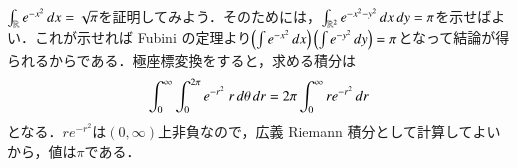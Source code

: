 \begin{exm}[Gauss 積分]$\int_{\mathbb{R}} e^{-x^2} \mathop{}\!d x = \sqrt{\pi}$を証明してみよう．そのためには，$\int_{\mathbb{R}^2} e^{-x^2-y^2} \mathop{}\!d x \mathop{}\!d y = \pi$を示せばよい．これが示せれば Fubini の定理より$\left(\int e^{-x^2} \mathop{}\!d x \right) \left(\int e^{-y^2} \mathop{}\!d y \right) = \pi$となって結論が得られるからである．極座標変換をすると，求める積分は
\begin{equation}
\int_0^\infty \int_0^{2\pi} e^{-r^2} \ r\dif\theta \dif r = 2\pi \int_0^\infty re^{-r^2} \dif r
\end{equation}となる．$re^{-r^2}$は$(0,\infty)$上非負なので，広義 Riemann 積分として計算してよいから，値は$\pi$である．
\end{exm}

